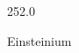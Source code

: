 \documentclass[12pt]{article}
\begin{document}
\hfill{}
\vfill
\begin{center}
  {\fontsize{50}{60}
  }

  252.0

Einsteinium
\end{center}
\vfill
\end{document}
